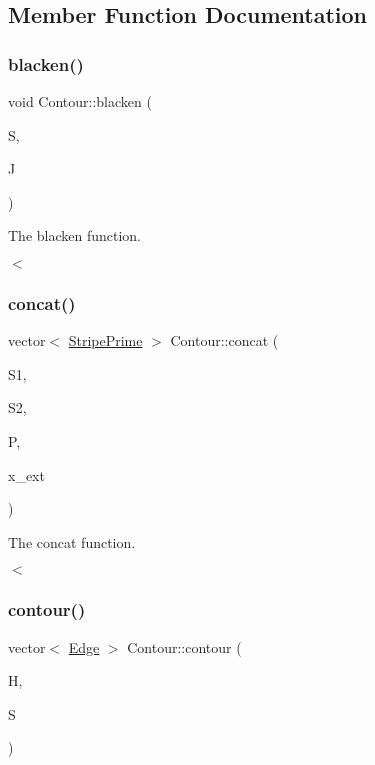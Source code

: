 \subsection{Member Function Documentation}
\mbox{\label{classContour_abbb3cdafee0371a3d17fdc4492254581}} 
\subsubsection{\texorpdfstring{blacken()}{blacken()}}
{\footnotesize\ttfamily void Contour\+::blacken (\begin{DoxyParamCaption}\item[{vector$<$ \hyperlink{classStripePrime}{Stripe\+Prime} $>$ \&}]{S,  }\item[{vector$<$ \hyperlink{classInterval}{Interval} $>$ \&}]{J }\end{DoxyParamCaption})}



The blacken function. 

$<$ \mbox{\label{classContour_a5d610630ea9afaa4921f832287811a0e}} 
\subsubsection{\texorpdfstring{concat()}{concat()}}
{\footnotesize\ttfamily vector$<$ \hyperlink{classStripePrime}{Stripe\+Prime} $>$ Contour\+::concat (\begin{DoxyParamCaption}\item[{vector$<$ \hyperlink{classStripePrime}{Stripe\+Prime} $>$ \&}]{S1,  }\item[{vector$<$ \hyperlink{classStripePrime}{Stripe\+Prime} $>$ \&}]{S2,  }\item[{vector$<$ float $>$ \&}]{P,  }\item[{\hyperlink{classInterval}{Interval}}]{x\+\_\+ext }\end{DoxyParamCaption})}



The concat function. 

$<$ \mbox{\label{classContour_a759427c3b84a8b17bf9dcedddc4be48f}} 
\subsubsection{\texorpdfstring{contour()}{contour()}}
{\footnotesize\ttfamily vector$<$ \hyperlink{classEdge}{Edge} $>$ Contour\+::contour (\begin{DoxyParamCaption}\item[{vector$<$ \hyperlink{classEdge}{Edge} $>$ \&}]{H,  }\item[{vector$<$ \hyperlink{classStripePrime}{Stripe\+Prime} $>$ \&}]{S }\end{DoxyParamCaption})}



